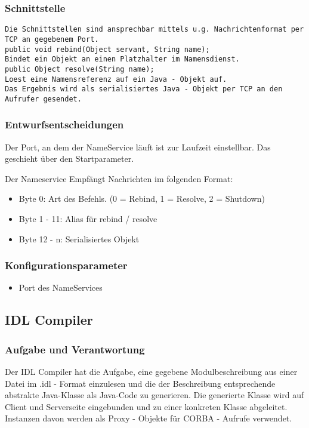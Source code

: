 \documentclass{article}
\begin{document}
\subsubsection{Schnittstelle}
\begin{lstlisting}
Die Schnittstellen sind ansprechbar mittels u.g. Nachrichtenformat per TCP an gegebenem Port. 
public void rebind(Object servant, String name); 
Bindet ein Objekt an einen Platzhalter im Namensdienst.
public Object resolve(String name); 
Loest eine Namensreferenz auf ein Java - Objekt auf.
Das Ergebnis wird als serialisiertes Java - Objekt per TCP an den Aufrufer gesendet.
\end{lstlisting}

\subsubsection{Entwurfsentscheidungen}
Der Port, an dem der NameService läuft ist zur Laufzeit einstellbar. Das geschieht über
den Startparameter.

Der Nameservice Empfängt Nachrichten im folgenden Format:
\begin{itemize}
\item Byte 0: Art des Befehls. (0 = Rebind, 1 = Resolve, 2 = Shutdown) 
\item Byte 1 - 11: Alias für rebind / resolve
\item Byte 12 - n: Serialisiertes Objekt
\end{itemize}

\subsubsection{Konfigurationsparameter}
\begin{itemize}
    \item Port des NameServices
\end{itemize}

\subsection{IDL Compiler}
\subsubsection{Aufgabe und Verantwortung}
Der IDL Compiler hat die Aufgabe, eine gegebene Modulbeschreibung aus einer Datei
im .idl - Format einzulesen und die der Beschreibung entsprechende abstrakte Java-Klasse 
als Java-Code zu generieren. Die generierte Klasse wird auf Client und Serverseite eingebunden
und zu einer konkreten Klasse abgeleitet. Instanzen davon werden als Proxy - Objekte
für CORBA - Aufrufe verwendet.
\end{document}
